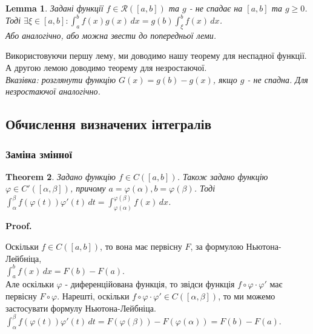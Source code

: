 \documentclass[a4paper, 10pt]{article}
\makeatletter
\def\huge{\displaystyle}
\def\qed{$\blacksquare$}
\theoremstyle{theoremdd}
\newtheorem{theorem}{Theorem}[subsection]
\theoremstyle{theoremdd}
\theoremstyle{theoremdd}
\theoremstyle{theoremdd}
\theoremstyle{theoremdd}
\theoremstyle{theoremdd}
\theoremstyle{theoremdd}
\theoremstyle{theoremdd}
\newtheorem{lemma}[theorem]{Lemma}
\theoremstyle{theoremdd}
\renewenvironment{proof}[1][Proof.\\]{\par
\pushQED{\hfill \qed}%
\normalfont \topsep6\p@\@plus6\p@\relax
\trivlist
\item\relax
{\bfseries
#1\@addpunct{.}}\hspace\labelsep\ignorespaces
}{%
\popQED\endtrivlist\@endpefalse
}
\makeatother
\begin{document}
\begin{lemma}
Задані функції $f \in \mathcal{R}([a,b])$ та $g$ - не спадає на $[a,b]$ та $g \geq 0$. \\
Тоді $\exists \xi \in [a,b]: \huge\int_a^b f(x)g(x)\,dx = g(b) \int_\xi^b f(x)\,dx$.\\
\textit{Або аналогічно, або можна звести до попередньої леми.}
\end{lemma}

Використовуючи першу лему, ми доводимо нашу теорему для неспадної функції. А другою лемою доводимо теорему для незростаючої.\\
\textit{Вказівка: розглянути функцію $G(x) = g(b) - g(x)$, якщо $g$ - не спадна. Для незростаючої аналогічно.}

\subsection{Обчислення визначених інтегралів}
\subsubsection{Заміна змінної}

\begin{theorem}
Задано функцію $f \in C([a,b])$. Також задано функцію $\varphi \in C'([\alpha,\beta])$, причому $a = \varphi(\alpha), b = \varphi(\beta)$. Тоді\\
$\huge\int_\alpha^\beta f(\varphi(t))\varphi'(t)\,dt = \int_{\varphi(\alpha)}^{\varphi(\beta)} f(x)\,dx$.
\end{theorem}

\begin{proof}
Оскільки $f \in C([a,b])$, то вона має первісну $F$, за формулою Ньютона-Лейбніца,\\
$\displaystyle\int_a^b f(x)\,dx = F(b) - F(a)$.\\
Але оскільки $\varphi$ - диференційована функція, то звідси функція $f \circ \varphi \cdot \varphi'$ має первісну $F \circ \varphi$. Нарешті, оскільки $f \circ \varphi \cdot \varphi' \in C([\alpha,\beta])$, то ми можемо застосувати формулу Ньютона-Лейбніца.\\
$\displaystyle\int_\alpha^\beta f(\varphi(t))\varphi'(t)\,dt = F(\varphi(\beta)) - F(\varphi(\alpha)) = F(b) - F(a)$.
\end{proof}
\end{document}

